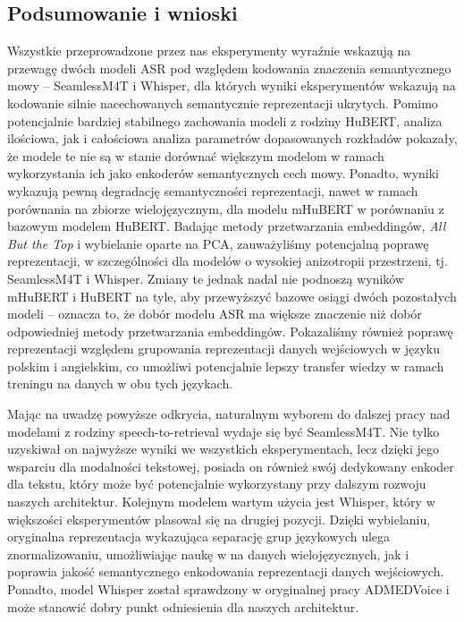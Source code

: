\subsection{Podsumowanie i wnioski}
Wszystkie przeprowadzone przez nas eksperymenty wyraźnie wskazują na przewagę dwóch modeli ASR pod względem kodowania znaczenia semantycznego mowy -- SeamlessM4T i Whisper, dla których wyniki eksperymentów wskazują na kodowanie silnie nacechowanych semantycznie reprezentacji ukrytych. Pomimo potencjalnie bardziej stabilnego zachowania modeli z rodziny HuBERT, analiza ilościowa, jak i całościowa analiza parametrów dopasowanych rozkładów pokazały, że modele te nie są w stanie dorównać większym modelom w ramach wykorzystania ich jako enkoderów semantycznych cech mowy. Ponadto, wyniki wykazują pewną degradację semantyczności reprezentacji, nawet w ramach porównania na zbiorze wielojęzycznym, dla modelu mHuBERT w porównaniu z bazowym modelem HuBERT. Badając metody przetwarzania embeddingów, \textit{All But the Top} i wybielanie oparte na PCA, zauważyliśmy potencjalną poprawę reprezentacji, w szczególności dla modelów o wysokiej anizotropii przestrzeni, tj. SeamlessM4T i Whisper. Zmiany te jednak nadal nie podnoszą wyników mHuBERT i HuBERT na tyle, aby przewyższyć bazowe osiągi dwóch pozostałych modeli -- oznacza to, że dobór modelu ASR ma większe znaczenie niż dobór odpowiedniej metody przetwarzania embeddingów. Pokazaliśmy również poprawę reprezentacji względem grupowania reprezentacji danych wejściowych w języku polskim i angielskim, co umożliwi potencjalnie lepszy transfer wiedzy w ramach treningu na danych w obu tych językach.

Mając na uwadzę powyższe odkrycia, naturalnym wyborem do dalszej pracy nad modelami z rodziny speech-to-retrieval wydaje się być SeamlessM4T. Nie tylko uzyskiwał on najwyższe wyniki we wszystkich eksperymentach, lecz dzięki jego wsparciu dla modalności tekstowej, posiada on również swój dedykowany enkoder dla tekstu, który może być potencjalnie wykorzystany przy dalszym rozwoju naszych architektur. Kolejnym modelem wartym użycia jest Whisper, który w większości eksperymentów plasował się na drugiej pozycji. Dzięki wybielaniu, oryginalna reprezentacja wykazująca separację grup językowych ulega znormalizowaniu, umożliwiając naukę w na danych wielojęzycznych, jak i poprawia jakość semantycznego enkodowania reprezentacji danych wejściowych. Ponadto, model Whisper został sprawdzony w oryginalnej pracy ADMEDVoice \cite{ADMEDVoice} i może stanowić dobry punkt odniesienia dla naszych architektur.
